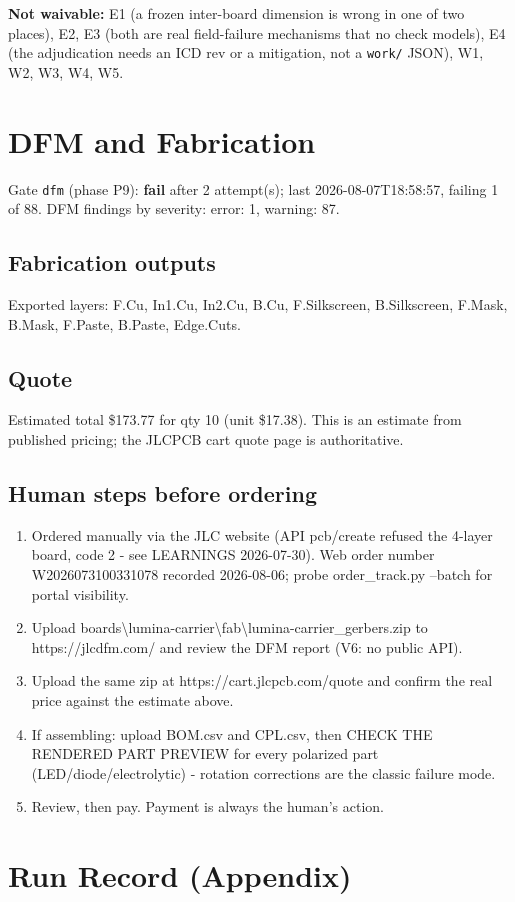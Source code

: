 \documentclass[11pt,a4paper]{article}
\begin{document}
\textbf{Not waivable:} E1 (a frozen inter-board dimension is wrong in one of two places), E2, E3 (both are real field-failure mechanisms that no check models), E4 (the adjudication needs an ICD rev or a mitigation, not a \texttt{work/} JSON), W1, W2, W3, W4, W5.

\section{DFM and Fabrication}
Gate \texttt{dfm} (phase P9): \textbf{fail} after 2 attempt(s); last 2026-08-07T18:58:57, failing 1 of 88.
DFM findings by severity: error: 1, warning: 87.
\subsection*{Fabrication outputs}
Exported layers: F.Cu, In1.Cu, In2.Cu, B.Cu, F.Silkscreen, B.Silkscreen, F.Mask, B.Mask, F.Paste, B.Paste, Edge.Cuts.
\subsection*{Quote}
Estimated total \$173.77 for qty 10 (unit \$17.38). This is an estimate from published pricing; the JLCPCB cart quote page is authoritative.
\subsection*{Human steps before ordering}
\begin{enumerate}
\item Ordered manually via the JLC website (API pcb/create refused the 4-layer board, code 2 - see LEARNINGS 2026-07-30). Web order number W2026073100331078 recorded 2026-08-06; probe order\_track.py --batch for portal visibility.
\item Upload boards\textbackslash{}lumina-carrier\textbackslash{}fab\textbackslash{}lumina-carrier\_gerbers.zip to https://jlcdfm.com/ and review the DFM report (V6: no public API).
\item Upload the same zip at https://cart.jlcpcb.com/quote and confirm the real price against the estimate above.
\item If assembling: upload BOM.csv and CPL.csv, then CHECK THE RENDERED PART PREVIEW for every polarized part (LED/diode/electrolytic) - rotation corrections are the classic failure mode.
\item Review, then pay. Payment is always the human's action.
\end{enumerate}
\section{Run Record (Appendix)}
\end{document}
